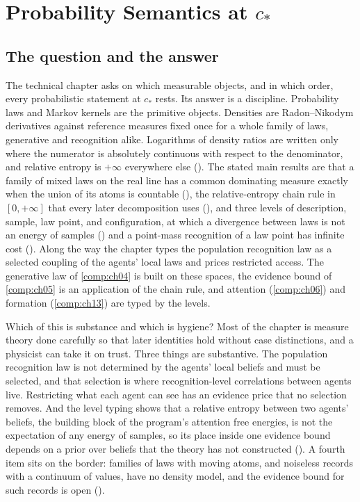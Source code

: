 \chapter{Probability Semantics at \texorpdfstring{$c_*$}{c*}}
\label{comp:ch03}

\section{The question and the answer}
\label{comp:ch03-question}

The technical chapter asks on which measurable objects, and in which order, every probabilistic statement at
$c_*$ rests. Its answer is a discipline. Probability laws and Markov kernels are the primitive objects.
Densities are Radon--Nikodym derivatives against reference measures fixed once for a whole family of laws,
generative and recognition alike. Logarithms of density ratios are written only where the numerator is
absolutely continuous with respect to the denominator, and relative entropy is $+\infty$ everywhere else
(). The stated main results are that a family of mixed laws on the
real line has a common dominating measure exactly when the union of its atoms is countable
(), the relative-entropy chain rule in $[0,+\infty]$ that every
later decomposition uses (), and three levels of description, sample, law point,
and configuration, at which a divergence between laws is not an energy of samples
() and a point-mass recognition of a law point has infinite cost
(). Along the way the chapter types the population recognition law as a
selected coupling of the agents' local laws and prices restricted access. The generative law of
\cref{comp:ch04} is built on these spaces, the evidence bound of \cref{comp:ch05} is an application of the
chain rule, and attention (\cref{comp:ch06}) and formation (\cref{comp:ch13}) are typed by the levels.

Which of this is substance and which is hygiene? Most of the chapter is measure theory done carefully so that
later identities hold without case distinctions, and a physicist can take it on trust. Three things are
substantive. The population recognition law is not determined by the agents' local beliefs and must be
selected, and that selection is where recognition-level correlations between agents live. Restricting what
each agent can see has an evidence price that no selection removes. And the level typing shows that a
relative entropy between two agents' beliefs, the building block of the program's attention free energies, is
not the expectation of any energy of samples, so its place inside one evidence bound depends on a prior over
beliefs that the theory has not constructed (). A fourth item sits on the border:
families of laws with moving atoms, and noiseless records with a continuum of values, have no density model,
and the evidence bound for such records is open ().

